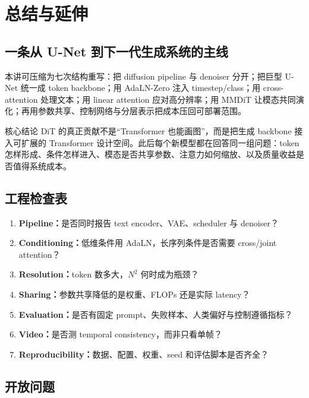 \documentclass[a4paper]{article}
\begin{document}
\section{总结与延伸}

\subsection{一条从 U-Net 到下一代生成系统的主线}

本讲可压缩为七次结构重写：把 diffusion pipeline 与 denoiser 分开；把巨型 U-Net 统一成 token backbone；用 AdaLN-Zero 注入 timestep/class；用 cross-attention 处理文本；用 linear attention 应对高分辨率；用 MMDiT 让模态共同演化；再用参数共享、控制网络与分层表示把成本压回可部署范围。

\begin{importantbox}{核心结论}
DiT 的真正贡献不是“Transformer 也能画图”，而是把生成 backbone 接入可扩展的 Transformer 设计空间。此后每个新模型都在回答同一组问题：token 怎样形成、条件怎样进入、模态是否共享参数、注意力如何缩放、以及质量收益是否值得系统成本。
\end{importantbox}

\subsection{工程检查表}

\begin{enumerate}
  \item \textbf{Pipeline：}是否同时报告 text encoder、VAE、scheduler 与 denoiser？
  \item \textbf{Conditioning：}低维条件用 AdaLN，长序列条件是否需要 cross/joint attention？
  \item \textbf{Resolution：}token 数多大，$N^2$ 何时成为瓶颈？
  \item \textbf{Sharing：}参数共享降低的是权重、FLOPs 还是实际 latency？
  \item \textbf{Evaluation：}是否有固定 prompt、失败样本、人类偏好与控制遵循指标？
  \item \textbf{Video：}是否测 temporal consistency，而非只看单帧？
  \item \textbf{Reproducibility：}数据、配置、权重、seed 和评估脚本是否齐全？
\end{enumerate}

\subsection{开放问题}
\end{document}
